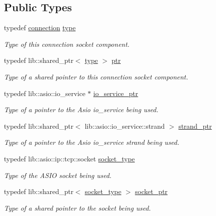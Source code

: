 \subsection*{Public Types}
\begin{DoxyCompactItemize}
\item 
typedef \hyperlink{classwebsocketpp_1_1transport_1_1asio_1_1basic__socket_1_1connection}{connection} \hyperlink{classwebsocketpp_1_1transport_1_1asio_1_1basic__socket_1_1connection_a449a7d627f3e231de1f25668b544478a}{type}
\begin{DoxyCompactList}\small\item\em Type of this connection socket component. \end{DoxyCompactList}\item 
typedef lib\+::shared\+\_\+ptr$<$ \hyperlink{classwebsocketpp_1_1transport_1_1asio_1_1basic__socket_1_1connection_a449a7d627f3e231de1f25668b544478a}{type} $>$ \hyperlink{classwebsocketpp_1_1transport_1_1asio_1_1basic__socket_1_1connection_a1a4fa6887235c53c7ddd13307798b280}{ptr}
\begin{DoxyCompactList}\small\item\em Type of a shared pointer to this connection socket component. \end{DoxyCompactList}\item 
typedef lib\+::asio\+::io\+\_\+service $\ast$ \hyperlink{classwebsocketpp_1_1transport_1_1asio_1_1basic__socket_1_1connection_af4c876008bd8610fb497c5d5be56faab}{io\+\_\+service\+\_\+ptr}
\begin{DoxyCompactList}\small\item\em Type of a pointer to the Asio io\+\_\+service being used. \end{DoxyCompactList}\item 
typedef lib\+::shared\+\_\+ptr$<$ lib\+::asio\+::io\+\_\+service\+::strand $>$ \hyperlink{classwebsocketpp_1_1transport_1_1asio_1_1basic__socket_1_1connection_aed8283ac4f3aa27ada9cd899d579e497}{strand\+\_\+ptr}
\begin{DoxyCompactList}\small\item\em Type of a pointer to the Asio io\+\_\+service strand being used. \end{DoxyCompactList}\item 
typedef lib\+::asio\+::ip\+::tcp\+::socket \hyperlink{classwebsocketpp_1_1transport_1_1asio_1_1basic__socket_1_1connection_ad08ccb2cf63fc0fae8543677daf54839}{socket\+\_\+type}
\begin{DoxyCompactList}\small\item\em Type of the A\+S\+I\+O socket being used. \end{DoxyCompactList}\item 
typedef lib\+::shared\+\_\+ptr$<$ \hyperlink{classwebsocketpp_1_1transport_1_1asio_1_1basic__socket_1_1connection_ad08ccb2cf63fc0fae8543677daf54839}{socket\+\_\+type} $>$ \hyperlink{classwebsocketpp_1_1transport_1_1asio_1_1basic__socket_1_1connection_a7a4985155bab6340a0ca9b165ccf51a4}{socket\+\_\+ptr}
\begin{DoxyCompactList}\small\item\em Type of a shared pointer to the socket being used. \end{DoxyCompactList}\end{DoxyCompactItemize}
